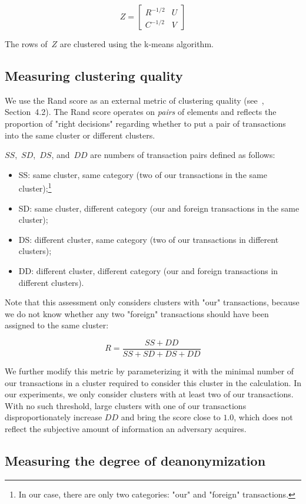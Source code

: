 \[
Z = 
\begin{bmatrix}
R^{-1/2} & U \\
C^{-1/2} & V
\end{bmatrix}
\]

The rows of~$Z$ are clustered using the k-means algorithm.


\subsection{Measuring clustering quality}

We use the Rand score as an external metric of clustering quality (see~\cite{Amigo2009}, Section~4.2).
The Rand score operates on \textit{pairs} of elements and reflects the proportion of "right decisions" regarding whether to put a pair of transactions into the same cluster or different clusters.

$SS$,~$SD$,~$DS$, and~$DD$ are numbers of transaction pairs defined as follows:
\begin{itemize}
	\item SS: same cluster, same category (two of our transactions in the same cluster);\footnote{In our case, there are only two categories: "our" and "foreign" transactions.}
	\item SD: same cluster, different category (our and foreign transactions in the same cluster);
	\item DS: different cluster, same category (two of our transactions in different clusters);
	\item DD: different cluster, different category (our and foreign transactions in different clusters).
\end{itemize}

Note that this assessment only considers clusters with "our" transactions, because we do not know whether any two "foreign" transactions should have been assigned to the same cluster:

\[
R = \frac{SS + DD}{SS + SD + DS + DD}
\]

We further modify this metric by parameterizing it with the minimal number of our transactions in a cluster required to consider this cluster in the calculation.
In our experiments, we only consider clusters with at least two of our transactions.
With no such threshold, large clusters with one of our transactions disproportionately increase $DD$ and bring the score close to $1.0$, which does not reflect the subjective amount of information an adversary acquires.

\subsection{Measuring the degree of deanonymization}

